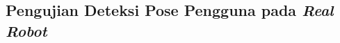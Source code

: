 \subsection{Pengujian Deteksi Pose Pengguna pada \emph{Real Robot}}
\label{subsec:deteksiposerobot}

\textcolor{red}{\lipsum[1-2]}
